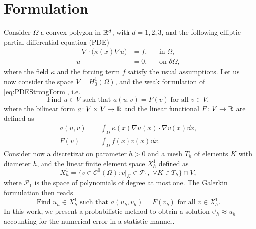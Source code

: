 \documentclass[10pt]{article}
\begin{document}
	
\maketitle	

\section{Formulation} Consider $\Omega$ a convex polygon in $\mathbb{R}^d$, with $d = 1, 2, 3$, and the following elliptic partial differential equation (PDE)
\begin{equation}\label{eq:PDEStrongForm}
\begin{aligned}
	-\nabla \cdot\big(\kappa(x) \nabla u\big) &= f, && \text{in } \Omega,\\
	 u &= 0, && \text{on } \partial\Omega,
\end{aligned}
\end{equation}
where the field $\kappa$ and the forcing term $f$ satisfy the usual assumptions. Let us now consider the space $V = H_0^1(\Omega)$, and the weak formulation of \eqref{eq:PDEStrongForm}, i.e.
\begin{equation}
	\text{Find } u \in V \text{ such that } a(u,v) = F(v) \text{ for all } v \in V,
\end{equation}
where the bilinear form $a\colon V\times V \to \mathbb{R}$ and the linear functional $F\colon V \to \mathbb{R}$ are defined as
\begin{equation}
\begin{split}
	a(u, v) &= \int_{\Omega} \kappa(x) \nabla u(x) \cdot \nabla v(x) \dd x ,\\
	F(v) &= \int_{\Omega} f(x) v(x) \dd x.
\end{split}
\end{equation}
Consider now a discretization parameter $h > 0$ and a mesh $T_h$ of elements $K$ with diameter $h$, and the linear finite element space $X^1_h$ defined as
\begin{equation}
	X^1_h = \{v \in \mathcal{C}^0(\Omega) \colon v|_{K} \in \mathcal{P}_1, \; \forall K \in T_h\} \cap V,
\end{equation}
where $\mathcal{P}_1$ is the space of polynomials of degree at most one. The Galerkin formulation then reads
\begin{equation}
	\text{Find } u_h \in X^1_h \text{ such that } a(u_h,v_h) = F(v_h) \text{ for all } v \in X^1_h.
\end{equation}
In this work, we present a probabilistic method to obtain a solution $U_h \approx u_h$ accounting for the numerical error in a statistic manner.
\end{document}
